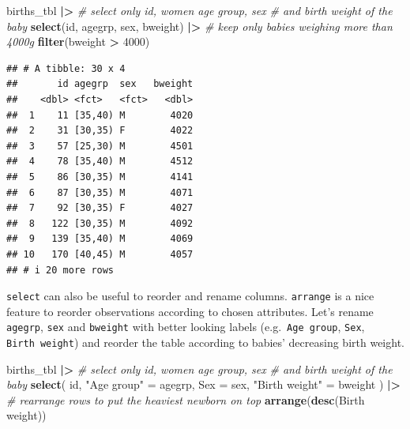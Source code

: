 \documentclass[
]{book}
\newenvironment{Shaded}{\begin{snugshade}}{\end{snugshade}}
\newcommand{\AttributeTok}[1]{\textcolor[rgb]{0.13,0.29,0.53}{#1}}
\newcommand{\CommentTok}[1]{\textcolor[rgb]{0.56,0.35,0.01}{\textit{#1}}}
\newcommand{\DecValTok}[1]{\textcolor[rgb]{0.00,0.00,0.81}{#1}}
\newcommand{\FunctionTok}[1]{\textcolor[rgb]{0.13,0.29,0.53}{\textbf{#1}}}
\newcommand{\NormalTok}[1]{#1}
\newcommand{\OtherTok}[1]{\textcolor[rgb]{0.56,0.35,0.01}{#1}}
\newcommand{\SpecialCharTok}[1]{\textcolor[rgb]{0.81,0.36,0.00}{\textbf{#1}}}
\newcommand{\StringTok}[1]{\textcolor[rgb]{0.31,0.60,0.02}{#1}}
\theoremstyle{definition}
\theoremstyle{definition}
\theoremstyle{definition}
\theoremstyle{definition}
\theoremstyle{remark}
\begin{document}
\begin{Shaded}
\begin{Highlighting}[]
\NormalTok{births\_tbl }\SpecialCharTok{|\textgreater{}}
  \CommentTok{\# select only id, women age group, sex }
  \CommentTok{\# and birth weight of the baby}
  \FunctionTok{select}\NormalTok{(id, agegrp, sex, bweight) }\SpecialCharTok{|\textgreater{}}
  \CommentTok{\# keep only babies weighing more than 4000g}
  \FunctionTok{filter}\NormalTok{(bweight }\SpecialCharTok{\textgreater{}} \DecValTok{4000}\NormalTok{)}
\end{Highlighting}
\end{Shaded}

\begin{verbatim}
## # A tibble: 30 x 4
##       id agegrp  sex   bweight
##    <dbl> <fct>   <fct>   <dbl>
##  1    11 [35,40) M        4020
##  2    31 [30,35) F        4022
##  3    57 [25,30) M        4501
##  4    78 [35,40) M        4512
##  5    86 [30,35) M        4141
##  6    87 [30,35) M        4071
##  7    92 [30,35) F        4027
##  8   122 [30,35) M        4092
##  9   139 [35,40) M        4069
## 10   170 [40,45) M        4057
## # i 20 more rows
\end{verbatim}

\texttt{select} can also be useful to reorder and rename columns.
\texttt{arrange} is a nice feature to reorder observations according to chosen attributes.
Let's rename \texttt{agegrp}, \texttt{sex} and \texttt{bweight} with better looking labels (e.g.~\texttt{Age\ group}, \texttt{Sex}, \texttt{Birth\ weight}) and reorder the table according to babies' decreasing birth weight.

\begin{Shaded}
\begin{Highlighting}[]
\NormalTok{births\_tbl }\SpecialCharTok{|\textgreater{}}
  \CommentTok{\# select only id, women age group, sex }
  \CommentTok{\# and birth weight of the baby}
  \FunctionTok{select}\NormalTok{(}
\NormalTok{    id,}
    \StringTok{"Age group"} \OtherTok{=}\NormalTok{ agegrp,}
    \AttributeTok{Sex =}\NormalTok{ sex,}
    \StringTok{"Birth weight"} \OtherTok{=}\NormalTok{ bweight}
\NormalTok{  ) }\SpecialCharTok{|\textgreater{}}
  \CommentTok{\# rearrange rows to put the heaviest newborn on top}
  \FunctionTok{arrange}\NormalTok{(}\FunctionTok{desc}\NormalTok{(}\StringTok{\textasciigrave{}}\AttributeTok{Birth weight}\StringTok{\textasciigrave{}}\NormalTok{))}
\end{Highlighting}
\end{Shaded}
\end{document}
